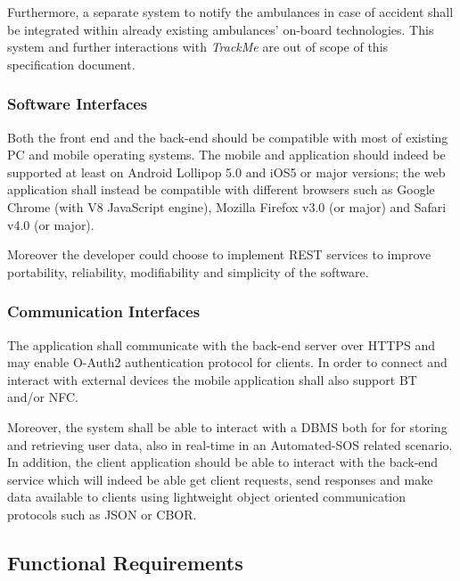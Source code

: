 \documentclass[a4paper]{article}
\begin{document}
        Furthermore, a separate system to notify the ambulances in case of accident shall be integrated within already existing ambulances' on-board technologies. This system and further interactions with \textit{TrackMe} are out of scope of this specification document.
        
        \subsubsection{Software Interfaces}
        Both the front end and the back-end should be compatible with most of existing PC and mobile operating systems. The mobile and application should indeed be supported at least on Android Lollipop 5.0 and iOS5 or major versions; the web application shall instead be compatible with different browsers such as Google Chrome (with V8 JavaScript engine), Mozilla Firefox v3.0 (or major) and Safari v4.0 (or major).
        
        Moreover the developer could choose to implement REST services to improve portability, reliability, modifiability and simplicity of the software.
        
        \subsubsection{Communication Interfaces}
        The application shall communicate with the back-end server over HTTPS and may enable O-Auth2 authentication protocol for clients. In order to connect and interact with external devices the mobile application shall also support BT and/or NFC.
        
        Moreover, the system shall be able to interact with a DBMS both for for storing and retrieving user data, also in real-time in an Automated-SOS related scenario. In addition, the client application should be able to interact with the back-end service which will indeed be able get client requests, send responses and make data available to clients using lightweight object oriented communication protocols such as JSON or CBOR.

\newpage    \subsection{Functional Requirements}
\end{document}
